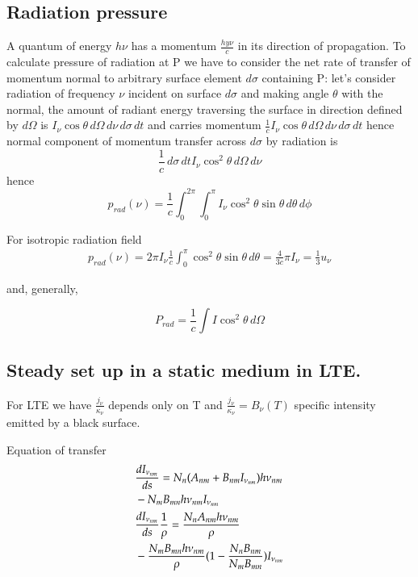 \documentclass[main.tex]{subfiles}
\newcommand{\mblock}[1]{ {\allowbreak $#1$ }}
\begin{document}
\subsection{Radiation pressure}

A quantum of energy $h\nu$ has a momentum $\frac{hy\nu}{c}$ in its direction of propagation. To calculate pressure of radiation at P we have to consider the net rate of transfer of momentum normal to arbitrary surface element $d\sigma$ containing P:
let's consider radiation of frequency $\nu$ incident on surface $d\sigma$ and making angle $\theta$ with the normal, the amount of radiant energy traversing the surface in direction defined by $d\Omega$ is \mblock{I_{\nu}\cos{\theta}\,d\Omega\,d\nu\,d\sigma\,dt} and carries momentum \mblock{\frac{1}{c}I_{\nu}\cos{\theta}\,d\Omega\,d\nu\,d\sigma\,dt} hence normal component of momentum transfer across $d\sigma$ by radiation is
\begin{equation*}
\frac{1}{c}\,d\sigma\,dtI_{\nu}\cos^2{\theta}\,d\Omega\,d\nu
\end{equation*}
hence
\begin{equation*}
p_{rad}(\nu)=\frac{1}{c}\int_0^{2\pi}\int_0^{\pi}I_{\nu}\cos^2{\theta}\sin{\theta}\,d\theta\,d\phi
\end{equation*}

For isotropic radiation field
\begin{align*}
p_{rad}(\nu)=2\pi I_{\nu}\frac{1}{c}\int_0^{\pi}\cos^2{\theta}\sin{\theta}\,d\theta=\frac{4}{3c}\pi I_{\nu}=\frac{1}{3}u_{\nu}
\end{align*}

and, generally,

\begin{equation*}
P_{rad}=\frac{1}{c}\int I\cos^2{\theta}\,d\Omega
\end{equation*}

\subsection{Steady set up in a static medium in LTE.}

For LTE we have $\frac{j_{\nu}}{\kappa_{\nu}}$ depends only on T and $\frac{j_{\nu}}{\kappa_{\nu}}=B_{\nu}(T)$ specific intensity emitted by a black surface.

Equation of transfer
\begin{align*}
&\TDy{s}{I_{\nu_{nm}}}=N_n(A_{nm}+B_{nm}I_{\nu_{nm}})h\nu_{nm}\\
&-N_mB_{mn}h\nu_{nm}I_{\nu_{nm}}\\
&\TDy{s}{I_{\nu_{nm}}}\frac{1}{\rho}=\frac{N_nA_{nm}h\nu_{nm}}{\rho}\\
&-\frac{N_mB_{mn}h\nu_{nm}}{\rho}(1-\frac{N_nB_{nm}}{N_mB_{mn}})I_{\nu_{nm}}
\end{align*}
\end{document}
